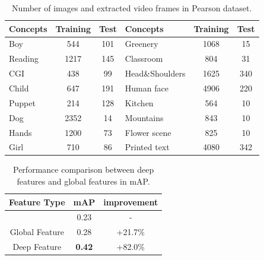 \documentclass[11pt,twocolumn,twoside]{IEEEtran}
\begin{document}
\begin{table}[t]\scriptsize
 \centering \caption{Number of images and extracted video frames in Pearson dataset. }
\begin{tabular}{|l|c|c|l|c|c|}
\hline Concepts     & Training      & Test   & Concepts     & Training      & Test       \\
\hline
\hline Boy          & 544           & 101    & Greenery     &  1068         & 15                 \\
\hline Reading      & 1217          &145   & Classroom    & 804           & 31              \\
\hline CGI          & 438           & 99     & Head\&Shoulders & 1625    & 340  \\
\hline Child        & 647           & 191    & Human face & 4906            & 220 \\
\hline Puppet       & 214           &128     & Kitchen      & 564           &10 \\
\hline Dog          & 2352          & 14     & Mountains    & 843           &10\\
\hline  Hands        & 1200          & 73     &Flower scene & 825           &10  \\
\hline Girl         & 710           & 86       &Printed text      & 4080          &342   \\

\hline
\end{tabular}
\label{tb:dataset}
\end{table}




\begin{table}[h]
 \centering \caption{Performance comparison between deep features and global features in mAP.}
\begin{tabular}{|c||c|c|}
\hline Feature Type      & mAP  & improvement     \\
\hline \cite{MED}        & 0.23 & -\\
\hline Global Feature    &0.28  & +21.7\%   \\
\hline Deep Feature     &\textbf{0.42}  & +82.0\%   \\
\hline
\end{tabular}
\label{tb:comp_feat}
\end{table}
\end{document}
